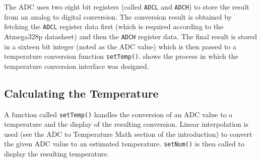 \documentclass[main.tex]{subfiles}
\begin{document}
		The ADC uses two eight bit registers (called \lstinline{ADCL} and
		\lstinline{ADCH}) to store the result from an analog to digital conversion.
		The conversion result is obtained by fetching the \lstinline{ADCL} register
		data first (which is required according to the Atmega328p datasheet) and
		then the \lstinline{ADCH} register data. The final result is stored in a
		sixteen bit integer (noted as the ADC value) which is then passed to a
		temperature conversion function \lstinline{setTemp()}.  
		shows the process in which the temperature conversion interface was
		designed.

		\subsection{Calculating the Temperature}
		A function called \lstinline{setTemp()} handles the conversion of an ADC
		value to a temperature and the display of the resulting conversion. Linear
		interpolation is used (see the ADC to Temperature Math section of the
		introduction) to convert the given ADC value to an estimated temperature.
		\lstinline{setNum()} is then called to display the resulting temperature.
\end{document}
